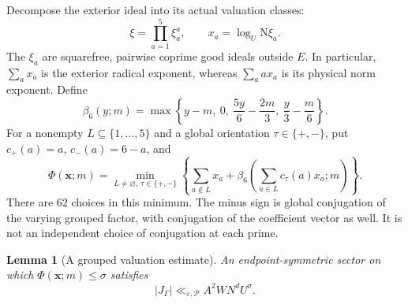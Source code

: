 \documentclass[11pt]{article}
\newtheorem{lemma}[theorem]{Lemma}
\theoremstyle{definition}
\newcommand{\N}{\mathrm N}
\newcommand{\eps}{\varepsilon}
\newcommand{\lls}{\ll_{\eps,\mathcal P}}
\begin{document}
Decompose the exterior ideal into its actual valuation classes:
\[
 \xi=\prod_{a=1}^5\xi_a^a,\qquad
 x_a=\log_U\N\xi_a.
\]
The $\xi_a$ are squarefree, pairwise coprime good ideals outside $E$.
In particular, $\sum_a x_a$ is the exterior radical exponent, whereas
$\sum_a ax_a$ is its physical norm exponent.  Define
\begin{equation}
 \beta_6(y;m)=\max\left\{y-m,\ 0,\
               \frac{5y}{6}-\frac{2m}{3},\
               \frac y3-\frac m6\right\}.
 \label{late-eq-beta6}
\end{equation}
For a nonempty $L\subseteq\{1,\ldots,5\}$ and a global orientation
$\tau\in\{+,-\}$, put $c_+(a)=a$, $c_-(a)=6-a$, and
\begin{equation}
 \Phi(\boldsymbol x;m)=
 \min_{L\ne\varnothing,\ \tau\in\{+,-\}}
 \left\{\sum_{a\notin L}x_a+
 \beta_6\left(\sum_{a\in L}c_\tau(a)x_a;m\right)\right\}.
 \label{late-eq-phi}
\end{equation}
There are $62$ choices in this minimum.  The minus sign is global
conjugation of the varying grouped factor, with conjugation of the
coefficient vector as well.  It is not an independent choice of
conjugation at each prime.

\begin{lemma}[A grouped valuation estimate]
\label{late-lem-grouped}
An endpoint-symmetric sector on which
$\Phi(\boldsymbol x;m)\le\sigma$ satisfies
\begin{equation}
 |J_\Gamma|\lls A^2W N^d U^\sigma.
 \label{late-eq-grouped-bound}
\end{equation}
\end{lemma}
\end{document}
